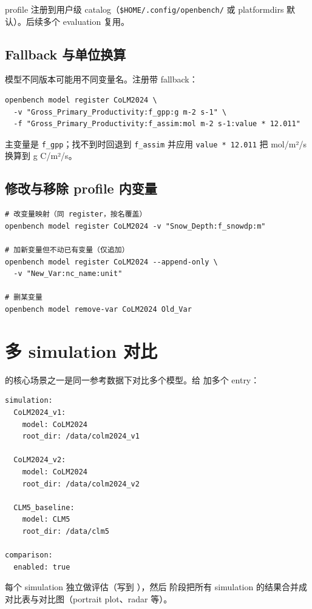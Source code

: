profile 注册到用户级 catalog（\texttt{\$HOME/.config/openbench/} 或 platformdirs 默认）。后续多个 evaluation 复用。

\subsection{Fallback 与单位换算}

模型不同版本可能用不同变量名。注册带 fallback：

\begin{verbatim}
openbench model register CoLM2024 \
  -v "Gross_Primary_Productivity:f_gpp:g m-2 s-1" \
  -f "Gross_Primary_Productivity:f_assim:mol m-2 s-1:value * 12.011"
\end{verbatim}

主变量是 \texttt{f\_gpp}；找不到时回退到 \texttt{f\_assim} 并应用 \texttt{value * 12.011} 把 mol/m²/s 换算到 g C/m²/s。

\subsection{修改与移除 profile 内变量}

\begin{verbatim}
# 改变量映射（同 register，按名覆盖）
openbench model register CoLM2024 -v "Snow_Depth:f_snowdp:m"

# 加新变量但不动已有变量（仅追加）
openbench model register CoLM2024 --append-only \
  -v "New_Var:nc_name:unit"

# 删某变量
openbench model remove-var CoLM2024 Old_Var
\end{verbatim}

\section{多 simulation 对比}

\openbench{} 的核心场景之一是同一参考数据下对比多个模型。给  加多个 entry：

\begin{verbatim}
simulation:
  CoLM2024_v1:
    model: CoLM2024
    root_dir: /data/colm2024_v1

  CoLM2024_v2:
    model: CoLM2024
    root_dir: /data/colm2024_v2

  CLM5_baseline:
    model: CLM5
    root_dir: /data/clm5

comparison:
  enabled: true
\end{verbatim}

每个 simulation 独立做评估（写到 ），然后  阶段把所有 simulation 的结果合并成对比表与对比图（portrait plot、radar 等）。

